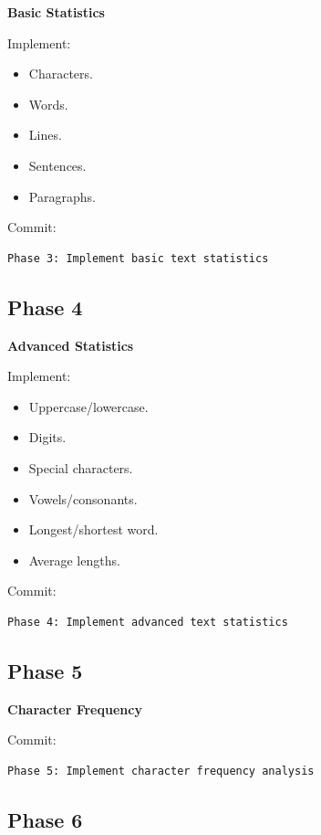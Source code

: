 \documentclass[12pt,a4paper]{article}
\begin{document}
\textbf{Basic Statistics}

Implement:

\begin{itemize}
    \item Characters.
    \item Words.
    \item Lines.
    \item Sentences.
    \item Paragraphs.
\end{itemize}

Commit:

\begin{verbatim}
Phase 3: Implement basic text statistics
\end{verbatim}

\subsection{Phase 4}

\textbf{Advanced Statistics}

Implement:

\begin{itemize}
    \item Uppercase/lowercase.
    \item Digits.
    \item Special characters.
    \item Vowels/consonants.
    \item Longest/shortest word.
    \item Average lengths.
\end{itemize}

Commit:

\begin{verbatim}
Phase 4: Implement advanced text statistics
\end{verbatim}

\subsection{Phase 5}

\textbf{Character Frequency}

Commit:

\begin{verbatim}
Phase 5: Implement character frequency analysis
\end{verbatim}

\subsection{Phase 6}
\end{document}
